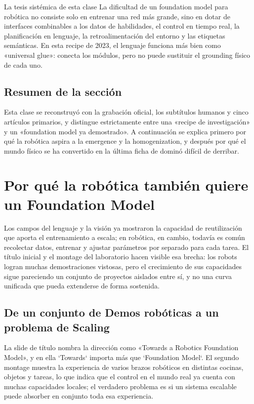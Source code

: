 \documentclass[a4paper]{article}
\begin{document}
\begin{importantbox}{La tesis sistémica de esta clase}
La dificultad de un foundation model para robótica no consiste solo en entrenar una red más grande, sino en dotar de interfaces combinables a los datos de habilidades, el control en tiempo real, la planificación en lenguaje, la retroalimentación del entorno y las etiquetas semánticas. En esta recipe de 2023, el lenguaje funciona más bien como «universal glue»: conecta los módulos, pero no puede sustituir el grounding físico de cada uno.
\end{importantbox}

\subsection{Resumen de la sección}

Esta clase se reconstruyó con la grabación oficial, los subtítulos humanos y cinco artículos primarios, y distingue estrictamente entre una «recipe de investigación» y un «foundation model ya demostrado». A continuación se explica primero por qué la robótica aspira a la emergence y la homogenization, y después por qué el mundo físico se ha convertido en la última ficha de dominó difícil de derribar.
\section{Por qué la robótica también quiere un Foundation Model}

Los campos del lenguaje y la visión ya mostraron la capacidad de reutilización que aporta el entrenamiento a escala; en robótica, en cambio, todavía es común recolectar datos, entrenar y ajustar parámetros por separado para cada tarea. El título inicial y el montage del laboratorio hacen visible esa brecha: los robots logran muchas demostraciones vistosas, pero el crecimiento de sus capacidades sigue pareciendo un conjunto de proyectos aislados entre sí, y no una curva unificada que pueda extenderse de forma sostenida.

\subsection{De un conjunto de Demos robóticas a un problema de Scaling}

La slide de título nombra la dirección como «Towards a Robotics Foundation Model», y en ella `Towards` importa más que `Foundation Model`. El segundo montage muestra la experiencia de varios brazos robóticos en distintas cocinas, objetos y tareas, lo que indica que el control en el mundo real ya cuenta con muchas capacidades locales; el verdadero problema es si un sistema escalable puede absorber en conjunto toda esa experiencia.
\end{document}
